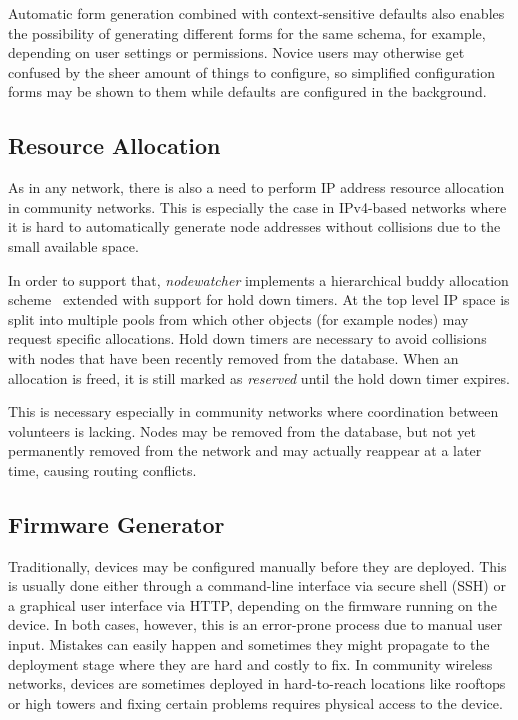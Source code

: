 \documentclass[5p,sort&compress]{elsarticle}
\newcommand{\nodewatcher}{\textit{nodewatcher}}
\begin{document}
Automatic form generation combined with context-sensitive defaults also enables the possibility of generating different forms for the same schema, for example, depending on user settings or permissions.
Novice users may otherwise get confused by the sheer amount of things to configure, so simplified configuration forms may be shown to them while defaults are configured in the background.

\subsection{Resource Allocation}

As in any network, there is also a need to perform IP address resource allocation in community networks.
This is especially the case in IPv4-based networks where it is hard to automatically generate node addresses without collisions due to the small available space.

In order to support that, \nodewatcher{} implements a hierarchical buddy allocation scheme~\cite{Peterson_1977} extended with support for hold down timers.
At the top level IP space is split into multiple pools from which other objects (for example nodes) may request specific allocations.
Hold down timers are necessary to avoid collisions with nodes that have been recently removed from the database.
When an allocation is freed, it is still marked as \textit{reserved} until the hold down timer expires.

This is necessary especially in community networks where coordination between volunteers is lacking.
Nodes may be removed from the database, but not yet permanently removed from the network and may actually reappear at a later time, causing routing conflicts.

\subsection{Firmware Generator}
\label{sec:firmware-generator}

Traditionally, devices may be configured manually before they are deployed.
This is usually done either through a command-line interface via secure shell (SSH) or a graphical user interface via HTTP, depending on the firmware running on the device.
In both cases, however, this is an error-prone process due to manual user input.
Mistakes can easily happen and sometimes they might propagate to the deployment stage where they are hard and costly to fix.
In community wireless networks, devices are sometimes deployed in hard-to-reach locations like rooftops or high towers and fixing certain problems requires physical access to the device.
\end{document}
